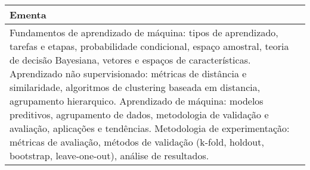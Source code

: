 \begin{quadro}[h!]
\begin{tabular}{|p{3cm} p{2cm} p{3cm} p{2cm} p{3cm} p{2cm}|}
\multicolumn{6}{|p{15cm}|}{\cellcolor{blue1} Ementa} \\\hline
\hline\multicolumn{6}{|p{15cm}|}{\scriptsize Fundamentos de aprendizado de máquina: tipos de aprendizado, tarefas e etapas, probabilidade condicional, espaço amostral, teoria de decisão Bayesiana, vetores e espaços de características. Aprendizado não supervisionado: métricas de distância e similaridade, algoritmos de clustering baseada em distancia, agrupamento hierarquico. Aprendizado de máquina: modelos preditivos, agrupamento de dados, metodologia de validação e avaliação, aplicações e tendências. Metodologia de experimentação: métricas de avaliação, métodos de validação (k-fold, holdout, bootstrap, leave-one-out), análise de resultados.}\\\hline
\hline
	\end{tabular}
\end{quadro}
